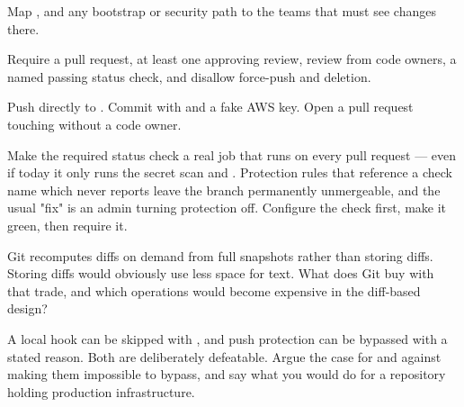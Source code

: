 Map ,  and any bootstrap or security path to the teams that must see changes there.

Require a pull request, at least one approving review, review from code owners, a named passing status check, and disallow force-push and deletion.

Push directly to . Commit with  and a fake AWS key. Open a pull request touching  without a code owner.

\begin{prodtip}
Make the required status check a real job that runs on every pull request --- even if today it only runs the secret scan and . Protection rules that reference a check name which never reports leave the branch permanently unmergeable, and the usual "fix" is an admin turning protection off. Configure the check first, make it green, then require it.
\end{prodtip}


\begin{thinkbox}
Git recomputes diffs on demand from full snapshots rather than storing diffs. Storing diffs would obviously use less space for text. What does Git buy with that trade, and which operations would become expensive in the diff-based design?
\end{thinkbox}

\begin{thinkbox}
A local  hook can be skipped with , and push protection can be bypassed with a stated reason. Both are deliberately defeatable. Argue the case for and against making them impossible to bypass, and say what you would do for a repository holding production infrastructure.
\end{thinkbox}

